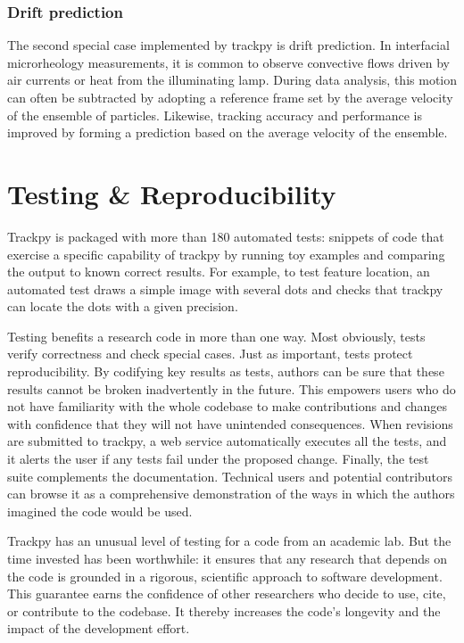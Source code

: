     \subsubsection{Drift prediction}\label{drift-prediction}
    
The second special case implemented by trackpy is drift prediction. In interfacial microrheology measurements, it is common to observe convective flows driven by air currents or heat from the illuminating lamp. During data analysis, this motion can often be subtracted by adopting a reference frame set by the average velocity of the ensemble of particles. Likewise, tracking accuracy and performance is improved by forming a prediction based on the average velocity of the ensemble.

\section{\label{sec:testing}Testing \& Reproducibility}

Trackpy is packaged with more than 180 automated tests: snippets of code that exercise a specific capability of trackpy by running toy examples and comparing the output to known correct results. For example, to test feature location, an automated test draws a simple image with several dots and checks that trackpy can locate the dots with a given precision.

Testing benefits a research code in more than one way. Most obviously, tests verify correctness and check special cases. Just as important, tests protect reproducibility. By codifying key results as tests, authors can be sure that these results cannot be broken inadvertently in the future. This empowers users who do not have familiarity with the whole codebase to make contributions and changes with confidence that they will not have unintended consequences. When revisions are submitted to trackpy, a web service automatically executes all the tests, and it alerts the user if any tests fail under the proposed change. Finally, the test suite complements the documentation. Technical users and potential contributors can browse it as a comprehensive demonstration of the ways in which the authors imagined the code would be used.

Trackpy has an unusual level of testing for a code from an academic lab. But the time invested has been worthwhile: it ensures that any research that depends on the code is grounded in a rigorous, scientific approach to software development. This guarantee earns the confidence of other researchers who decide to use, cite, or contribute to the codebase. It thereby increases the code's longevity and the impact of the development effort.

